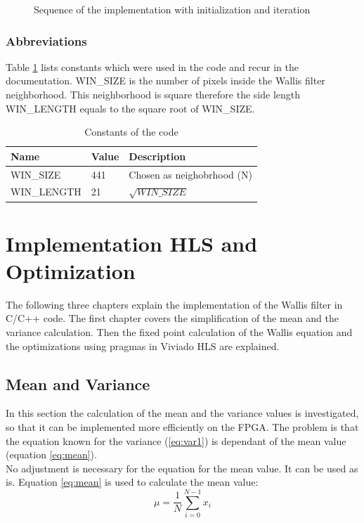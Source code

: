 \begin{figure}[tb!]
    \centering
    \begin{adjustbox}{max width=0.9\textwidth}
        
    \end{adjustbox}
    \caption{Sequence of the implementation with initialization and iteration}
    \label{fig:sequence}
\end{figure}

\subsubsection*{Abbreviations}
Table \ref{tab:ip:abbreviations} lists constants which were used in the code and
recur in the documentation. WIN\_SIZE is the number of pixels inside the Wallis
filter neighborhood. This neighborhood is square therefore the side length
WIN\_LENGTH equals to the square root of WIN\_SIZE.

\begin{table}[h!]
    \centering
    \begin{tabular}{l l l}
        \toprule
        Name & Value & Description  \\
        \midrule
        WIN\_SIZE & 441 & Chosen as neighobrhood (N)
        \\
        WIN\_LENGTH & 21 & $\sqrt{WIN\_SIZE}$ 
        \\
        \bottomrule
    \end{tabular}
    \caption{Constants of the code}
    \label{tab:ip:abbreviations}
\end{table}


\section{Implementation HLS and Optimization} \label{ch:ip:hls_opt}
The following three chapters explain the implementation of the Wallis filter in
C/C++ code. The first chapter covers the simplification of the mean and the
variance calculation. Then the fixed point calculation of the Wallis equation
and the optimizations using pragmas in Viviado HLS are explained.

\subsection{Mean and Variance} \label{ch:ip:mean_var}
In this section the calculation of the mean and the variance values is
investigated, so that it can be implemented more efficiently on the FPGA. The problem is that the equation known for the variance (\ref{eq:var1}) is dependant of the mean value (equation \ref{eq:mean}).\\
No adjustment is necessary for the equation for the mean value. It can be used as is. Equation \ref{eq:mean} is used to calculate the mean value:
\begin{equation}
    \mu = \frac{1}{N} \sum_{i = 0}^{N - 1} x_{i}
    \label{eq:mean}
\end{equation} 

